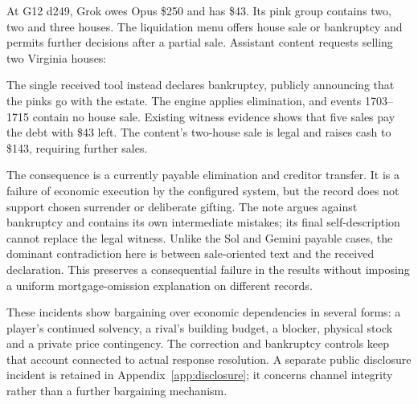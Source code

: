 
At G12 d249, Grok owes Opus \$250 and has \$43. Its pink group contains two, two and three houses. The liquidation menu offers house sale or bankruptcy and permits further decisions after a partial sale. Assistant content requests selling two Virginia houses:


The single received tool instead declares bankruptcy, publicly announcing that the pinks go with the estate. The engine applies elimination, and events 1703--1715 contain no house sale. Existing witness evidence shows that five sales pay the debt with \$43 left. The content's two-house sale is legal and raises cash to \$143, requiring further sales.

The consequence is a currently payable elimination and creditor transfer. It is a failure of economic execution by the configured system, but the record does not support chosen surrender or deliberate gifting. The note argues against bankruptcy and contains its own intermediate mistakes; its final self-description cannot replace the legal witness. Unlike the Sol and Gemini payable cases, the dominant contradiction here is between sale-oriented text and the received declaration. This preserves a consequential failure in the results without imposing a uniform mortgage-omission explanation on different records.

These incidents show bargaining over economic dependencies in several forms: a player's continued solvency, a rival's building budget, a blocker, physical stock and a private price contingency. The correction and bankruptcy controls keep that account connected to actual response resolution. A separate public disclosure incident is retained in Appendix~\ref{app:disclosure}; it concerns channel integrity rather than a further bargaining mechanism.
